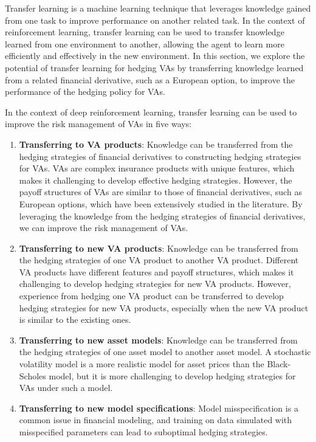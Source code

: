 Transfer learning is a machine learning technique that leverages knowledge gained from one task to improve performance on another related task.
In the context of reinforcement learning, transfer learning can be used to transfer knowledge learned from one environment to another, allowing the agent to learn more efficiently and effectively in the new environment.
In this section, we explore the potential of transfer learning for hedging VAs by transferring knowledge learned from a related financial derivative, such as a European option, to improve the performance of the hedging policy for VAs.

In the context of deep reinforcement learning, transfer learning can be used to improve the risk management of VAs in five ways:
\begin{enumerate}
    \item   \textbf{Transferring to VA products}: Knowledge can be transferred from the hedging strategies of financial derivatives to constructing hedging strategies for VAs.
    VAs are complex insurance products with unique features, which makes it challenging to develop effective hedging strategies.
    However, the payoff structures of VAs are similar to those of financial derivatives, such as European options, which have been extensively studied in the literature.
    By leveraging the knowledge from the hedging strategies of financial derivatives, we can improve the risk management of VAs.
    \item   \textbf{Transferring to new VA products}: Knowledge can be transferred from the hedging strategies of one VA product to another VA product.
    Different VA products have different features and payoff structures, which makes it challenging to develop hedging strategies for new VA products.
    However, experience from hedging one VA product can be transferred to develop hedging strategies for new VA products, especially when the new VA product is similar to the existing ones.
    \item   \textbf{Transferring to new asset models}: Knowledge can be transferred from the hedging strategies of one asset model to another asset model.
    A stochastic volatility model is a more realistic model for asset prices than the Black-Scholes model, but it is more challenging to develop hedging strategies for VAs under such a model.
    \item  \textbf{Transferring to new model specifications}: Model misspecification is a common issue in financial modeling, and training on data simulated with misspecified parameters can lead to suboptimal hedging strategies.

\end{enumerate}
